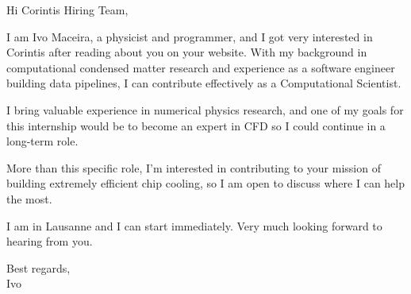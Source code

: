 \documentclass[a4paper,12pt]{letter}
\begin{document}
Hi Corintis Hiring Team,

I am Ivo Maceira, a physicist and programmer, and I got very interested in Corintis after reading about you on your website. With my background in computational condensed matter research and experience as a software engineer building data pipelines, I can contribute effectively as a Computational Scientist.

I bring valuable experience in numerical physics research, and one of my goals for this internship would be to become an expert in CFD so I could continue in a long-term role.

More than this specific role, I'm interested in contributing to your mission of building extremely efficient chip cooling, so I am open to discuss where I can help the most.

I am in Lausanne and I can start immediately. Very much looking forward to hearing from you.

Best regards, \\
Ivo
\end{document}
